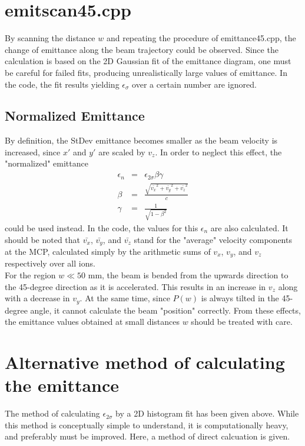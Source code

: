 \documentclass{article}
\begin{document}
\section{emitscan45.cpp}
By scanning the distance $w$ and repeating the procedure of emittance45.cpp, the change of emittance along the beam trajectory could be observed. Since the calculation is based on the 2D Gaussian fit of the emittance diagram, one must be careful for failed fits, producing unrealistically large values of emittance. In the code, the fit results yielding $\epsilon_{\sigma}$ over a certain number are ignored. 

\subsection{Normalized Emittance}
By definition, the StDev emittance becomes smaller as the beam velocity is increased, since $x'$ and $y'$ are scaled by $v_z$. In order to neglect this effect, the "normalized" emittance
\begin{eqnarray*}
\epsilon_n & = & \epsilon_{2\sigma} \beta \gamma \\
\beta & = & \frac{\sqrt{\bar{v_x}^2 + \bar{v_y}^2 + \bar{v_z}^2}}{c} \\
\gamma & = & \frac{1}{\sqrt{1-\beta^2}}
\end{eqnarray*}
could be used instead. In the code, the values for this $\epsilon_n$ are also calculated. It should be noted that $\bar{v_x}$, $\bar{v_y}$, and $\bar{v_z}$ stand for the "average" velocity components at the MCP, calculated simply by the arithmetic sums of $v_x$, $v_y$, and $v_z$ respectively over all ions. \\
For the region $w \ll 50$ mm, the beam is bended from the upwards direction to the 45-degree direction as it is accelerated. This results in an increase in $v_z$ along with a decrease in $v_y$. At the same time, since $P(w)$ is always tilted in the 45-degree angle, it cannot calculate the beam "position" correctly. From these effects, the emittance values obtained at small distances $w$ should be treated with care.




\section{Alternative method of calculating the emittance}
The method of calculating $\epsilon_{2\sigma}$ by a 2D histogram fit has been given above. While this method is conceptually simple to understand, it is computationally heavy, and preferably must be improved. Here, a method of direct calcuation is given. \\
\end{document}
